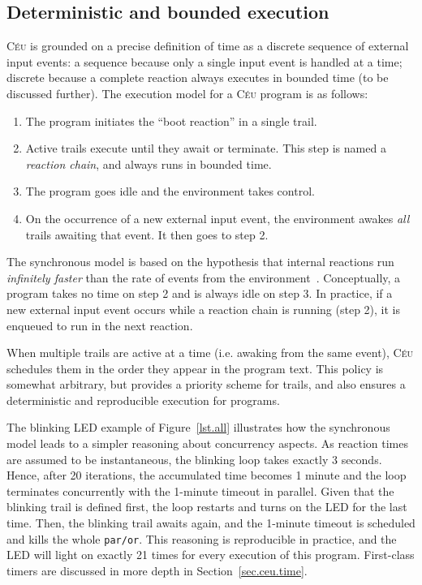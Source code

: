 \documentclass[10pt]{sensys-proc}
\newcommand{\CEU}{\textsc{C\'{e}u}\xspace}
\newcommand{\code}[1] {{\small{\texttt{#1}}}}
\begin{document}
\subsection{Deterministic and bounded execution}
\label{sec.ceu.det}


\CEU{} is grounded on a precise definition of time as a discrete sequence of 
external input events:
a sequence because only a single input event is handled at a time; discrete 
because a complete reaction always executes in bounded time (to be discussed 
further).
The execution model for a \CEU{} program is as follows:

\begin{enumerate}
\item The program initiates the ``boot reaction'' in a single trail.
\item Active trails execute until they await or terminate.
      This step is named a \emph{reaction chain}, and always runs in bounded 
      time.
\item The program goes idle and the environment takes control.
\item On the occurrence of a new external input event, the environment awakes 
      \emph{all} trails awaiting that event.
      It then goes to step 2.
\end{enumerate}

The synchronous model is based on the hypothesis that internal reactions run 
\emph{infinitely faster} than the rate of events from the 
environment~\cite{rp.hypothesis}.
Conceptually, a program takes no time on step 2 and is always idle on step 3.
In practice, if a new external input event occurs while a reaction chain is 
running (step 2), it is enqueued to run in the next reaction.


When multiple trails are active at a time (i.e. awaking from the same event), 
\CEU schedules them in the order they appear in the program text.
This policy is somewhat arbitrary, but provides a priority scheme for trails, 
and also ensures a deterministic and reproducible execution for programs.

The blinking LED example of Figure~\ref{lst.all} illustrates how the 
synchronous model leads to a simpler reasoning about concurrency aspects.
As reaction times are assumed to be instantaneous, the blinking loop takes 
exactly 3 seconds.
Hence, after 20 iterations, the accumulated time becomes 1 minute and the loop 
terminates concurrently with the 1-minute timeout in parallel.
Given that the blinking trail is defined first, the loop restarts and turns on 
the LED for the last time.
Then, the blinking trail awaits again, and the 1-minute timeout is scheduled 
and kills the whole \code{par/or}.
This reasoning is reproducible in practice, and the LED will light on exactly 
21 times for every execution of this program.
First-class timers are discussed in more depth in Section~\ref{sec.ceu.time}.
\end{document}
